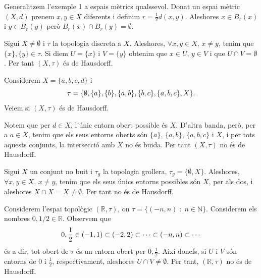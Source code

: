 \documentclass[../main.tex]{subfiles}
\begin{document}
\begin{ej}
\label{ej:hausdorff2} Generalitzem l'exemple 1 a espais mètrics qualssevol. Donat un espai mètric $(X,d)$ prenem $x,y\in X$ diferents i definim $r = \frac{1}{2}d(x,y)$. Aleshores $x\in B_r(x)$ i $y\in B_r(y)$ però $B_r(x)\cap B_r(y) = \emptyset$.
\end{ej}

\begin{ej}
\label{ej:hausdorff3} Sigui $X\not=\emptyset$ i $\tau$ la topologia discreta a $X$. Aleshores, $\forall x,y\in X$, $x\not=y$, tenim que $\{x\},\{y\}\in\tau$. Si diem $U = \{x\}$ i $V = \{y\}$ obtenim que $x\in U$, $y\in V$ i que $U\cap V = \emptyset$. Per tant $(X,\tau)$ és de Hausdorff.
\end{ej}

\begin{ej}
\label{ej:hausdorff4} Considerem $X = \{a,b,c,d\}$ i 
\begin{equation}
    \notag
    \tau = \{\emptyset,\{a\},\{b\},\{a,b\},\{b,c\},\{a,b,c\},X\} .
\end{equation}
Veiem si $(X,\tau)$ és de Hausdorff.

Notem que per $d\in X$, l'únic entorn obert possible és $X$. D'altra banda, però, per a $a\in X$, tenim que els seus entorns oberts són $\{a\}$, $\{a,b\}$, $\{a,b,c\}$ i $X$, i per tots aquests conjunts, la intersecció amb $X$ no és buida. Per tant $(X,\tau)$ no és de Hausdorff.
\end{ej}

\begin{ej}
\label{ej:hausdorff5} Sigui $X$ un conjunt no buit i $\tau_g$ la topologia grollera, $\tau_g = \{\emptyset,X\}$. Aleshores, $\forall x,y\in X$, $x\not=y$, tenim que els seus únics entorns possibles són $X$, per als dos, i aleshores $X\cap X = X\not=\emptyset$. Per tant no és de Hausdorff.
\end{ej}

\begin{ej}
\label{ej:hausdorff6} Considerem l'espai topològic $(\mathbb{R},\tau)$, on $\tau = \{(-n,n)\;:\;n\in\mathbb{N}\}$. Considerem els nombres $0,1/2\in\mathbb{R}$. Observem que
\begin{equation}
    \notag
    0,\frac{1}{2}\in (-1,1)\subset(-2,2)\subset\cdots\subset(-n,n)\subset\cdots
\end{equation}
és a dir, tot obert de $\tau$ és un entorn obert per $0,\frac{1}{2}$. Així doncfs, si $U$ i $V$ són entorns de $0$ i $\frac{1}{2}$, respectivament, aleshores $U\cap V\not=\emptyset$. Per tant, $(\mathbb{R},\tau)$ no és de Hausdorff.
\end{ej}
\end{document}
